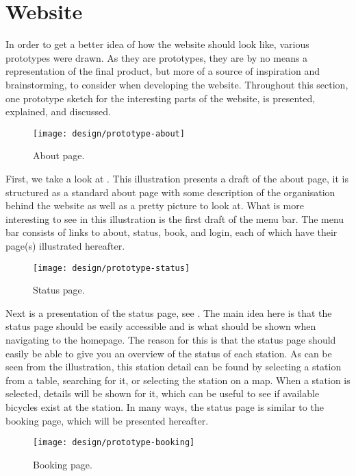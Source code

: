 \section{Website}
In order to get a better idea of how the website should look like, various prototypes were drawn.
As they are prototypes, they are by no means a representation of the final product, but more of a source of inspiration and brainstorming, to consider when developing the website.
Throughout this section, one prototype sketch for the interesting parts of the website, is presented, explained, and discussed.

\begin{figure}[h]
	\centering
	\texttt{[image: design/prototype-about]}
	\caption{About page.}\label{fig:prototype-about}
\end{figure}

First, we take a look at .
This illustration presents a draft of the about page, it is structured as a standard about page with some description of the organisation behind the website as well as a pretty picture to look at.
What is more interesting to see in this illustration is the first draft of the menu bar.
The menu bar consists of links to about, status, book, and login, each of which have their page(s) illustrated hereafter.

\begin{figure}[h]
	\centering
	\texttt{[image: design/prototype-status]}
	\caption{Status page.}\label{fig:prototype-status}
\end{figure}

Next is a presentation of the status page, see .
The main idea here is that the status page should be easily accessible and is what should be shown when navigating to the homepage.
The reason for this is that the status page should easily be able to give you an overview of the status of each station.
As can be seen from the illustration, this station detail can be found by selecting a station from a table, searching for it, or selecting the station on a map.
When a station is selected, details will be shown for it, which can be useful to see if available bicycles exist at the station.
In many ways, the status page is similar to the booking page, which will be presented hereafter.

\begin{figure}[h]
	\centering
	\texttt{[image: design/prototype-booking]}
	\caption{Booking page.}\label{fig:prototype-book}
\end{figure}

